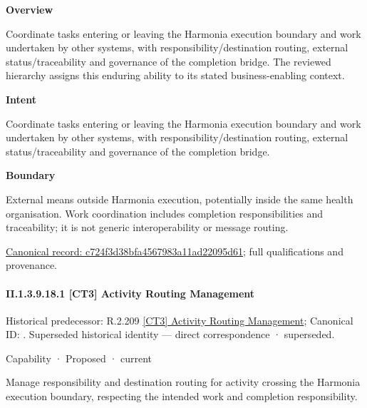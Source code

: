 \textbf{Overview}



Coordinate tasks entering or leaving the Harmonia execution boundary and work undertaken by other systems, with responsibility/destination routing, external status/traceability and governance of the completion bridge. The reviewed hierarchy assigns this enduring ability to its stated business-enabling context.



\textbf{Intent}



Coordinate tasks entering or leaving the Harmonia execution boundary and work undertaken by other systems, with responsibility/destination routing, external status/traceability and governance of the completion bridge.



\textbf{Boundary}



External means outside Harmonia execution, potentially inside the same health organisation. Work coordination includes completion responsibilities and traceability; it is not generic interoperability or message routing.


{\footnotesize \href{../../../../../../../continuum/strategy/capability/c724f3d38bfa4567983a11ad22095d61.md}{Canonical record: c724f3d38bfa4567983a11ad22095d61}; full qualifications and provenance.}\par
\paragraph*{II.1.3.9.18.1 [CT3] Activity Routing Management}
\label{navigation:II.1.3.9.18.1}

{\small Historical predecessor: R.2.209 \hyperref[element:243ea93e7b7448fe97dc74f90bfc8946]{[CT3] Activity Routing Management}; Canonical ID: \texttt{}. Superseded historical identity — direct correspondence · superseded.}\par
\label{element:27411c143e6e41ffba1af139fbbcd7e2}
{\small Capability · Proposed · current}\par

Manage responsibility and destination routing for activity crossing the Harmonia execution boundary, respecting the intended work and completion responsibility.



